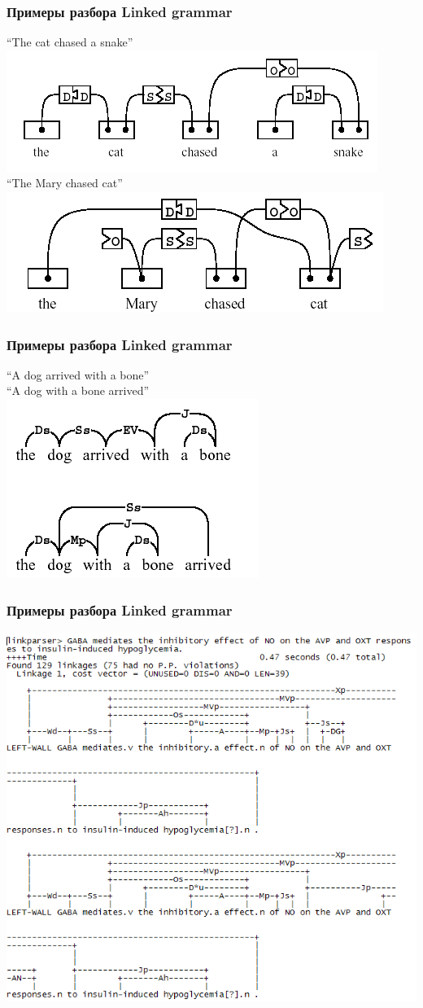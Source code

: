 \documentclass[10pt]{beamer}
\begin{document}
\begin{frame}
  \frametitle{Примеры разбора Linked grammar}
  \centering
  “The cat chased a snake”\\
  \includegraphics[width=0.6\linewidth]{pics/l-g-good-ex.png}\\[1em]
  “The Mary chased cat”\\
  \includegraphics[width=0.6\linewidth]{pics/l-g-bad-ex.png}
\end{frame}

\begin{frame}
  \frametitle{Примеры разбора Linked grammar}
  \centering
  “A dog arrived with a bone”\\
  “A dog with a bone arrived”\\
  \includegraphics[width=0.6\linewidth]{pics/l-g-multi-ex.png}\\[1em]
\end{frame}

\begin{frame}
  \frametitle{Примеры разбора Linked grammar}
  \centering
  \includegraphics[width=0.8\linewidth]{pics/l-g-prog-ex.png}\\[1em]
\end{frame}
\end{document}
